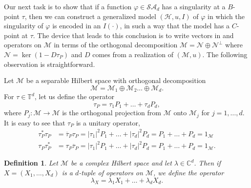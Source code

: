 \documentclass[11pt, reqno]{amsart}
\newtheorem{definition}[theorem]{Definition}
\newcommand\1{\boldsymbol {1}}
\newcommand{\sad}{\mathcal{SA}_d}
\newcommand{\M}{\mathcal{M}}
\newcommand{\N}{\mathcal{N}}
\newcommand{\vp}{\varphi}
\newcommand{\ph}{\varphi}
\numberwithin{equation}{section}
\begin{document}
Our next task is to show that if a function  $\vp\in\sad$ has a singularity at a $B$-point $\tau$, then we can construct a generalized model  $(\mathcal H, u, I)$
of $\ph$ in which the singularity of $\ph$ is encoded in an $I(\cdot)$, in such a way that the model has a $C$-point at $\tau$.  The device that leads to this conclusion is to write vectors in and operators on $\M$ in terms of the orthogonal decomposition $\M=\N\oplus\N^\perp$ where $\N= \ker(1-D\tau_P)$ and $D$ comes from a realization of $(\M,u)$.  The following observation is straightforward.

Let $\mathcal{M}$ be a separable Hilbert space with orthogonal decomposition 
$$\mathcal{M}=\mathcal{M}_{1}\oplus\mathcal{M}_{2}\hdots\oplus \mathcal{M}_{d}.$$
For $\tau\in\mathbb{T}^{d}$, let us define the operator
$$\tau_{P} = \tau_{1}P_{1}+\hdots+\tau_{d}P_{d},$$
where $P_{j}:\mathcal{M}\rightarrow\mathcal{M}$ is the orthogonal projection from $\mathcal{M}$ onto $\mathcal{M}_{j}$ for $j=1,\hdots,d$. It is easy to see that $\tau_{P}$ is a unitary operator, 
\begin{align*}
    \tau_{P}^{*}\tau_{P} &= \overline{\tau}_{P}\tau_{P} = \lvert \tau_{1} \rvert^{2}P_{1}+\hdots+\lvert \tau_{d}\rvert^{2}P_{d} = P_{1}+\hdots+P_{d} = 1_{\mathcal{M}}\\
    \tau_{P}\tau^{*}_{P} &= \tau_{P}\overline{\tau}_{P} = \lvert \tau_{1} \rvert^{2}P_{1}+\hdots+\lvert \tau_{d}\rvert^{2}P_{d} = P_{1}+\hdots+P_{d} = 1_{\mathcal{M}}.
\end{align*} 
\begin{definition}\label{lambdaincdastupleofoperators}
Let $\mathcal{M}$ be a complex Hilbert space and let $\lambda \in \mathbb{C}^{d}$. Then if $X = (X_{1}, \hdots, X_{d})$ is a $d$-tuple of operators on $\mathcal{M}$, we define the operator
$$ \lambda_{X} = \lambda_{1}X_{1}+\hdots+\lambda_{d}X_{d}.$$
\end{definition}
\end{document}
